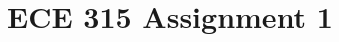 \documentclass[letterpaper]{article}
\title{ECE 315 Assignment 1}
\author{\me}
\begin{document}
\maketitle

\section{}


\section{}


\section{}


\section{}


\section{}


\section{}


\section{}


\section{}

\end{document}
